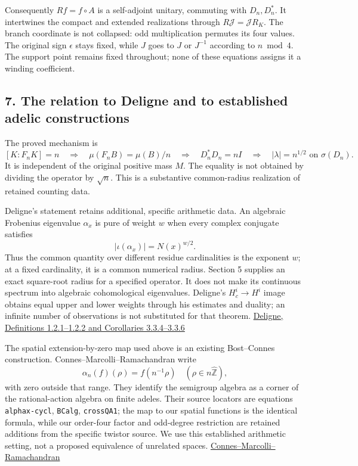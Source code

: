 \documentclass[
]{article}
\begin{document}
Consequently \(Rf=f\circ A\) is a self-adjoint unitary, commuting with
\(D_n,D_n^*\). It intertwines the compact and extended realizations
through \(R\mathcal J=\mathcal J R_K\). The branch coordinate is not
collapsed: odd multiplication permutes its four values. The original
sign \(\epsilon\) stays fixed, while \(J\) goes to \(J\) or \(J^{-1}\)
according to \(n\bmod4\). The support point remains fixed throughout;
none of these equations assigns it a winding coefficient.

\subsection{7. The relation to Deligne and to established adelic
constructions}\label{the-relation-to-deligne-and-to-established-adelic-constructions}

The proved mechanism is \[
[K:F_nK]=n
\quad\Longrightarrow\quad \mu(F_nB)=\mu(B)/n
\quad\Longrightarrow\quad D_n^*D_n=nI
\quad\Longrightarrow\quad |\lambda|=n^{1/2}\text{ on }\sigma(D_n).
\] It is independent of the original positive mass \(M\). The equality
is not obtained by dividing the operator by \(\sqrt n\). This is a
substantive common-radius realization of retained counting data.

Deligne's statement retains additional, specific arithmetic data. An
algebraic Frobenius eigenvalue \(\alpha_x\) is pure of weight \(w\) when
every complex conjugate satisfies \[
|\iota(\alpha_x)|=N(x)^{w/2}.
\] Thus the common quantity over different residue cardinalities is the
exponent \(w\); at a fixed cardinality, it is a common numerical radius.
Section 5 supplies an exact square-root radius for a specified operator.
It does not make its continuous spectrum into algebraic cohomological
eigenvalues. Deligne's \(H_c^i\to H^i\) image obtains equal upper and
lower weights through his estimates and duality; an infinite number of
observations is not substituted for that theorem.
\href{https://www.numdam.org/item/PMIHES_1980__52__137_0/}{Deligne,
Definitions 1.2.1--1.2.2 and Corollaries 3.3.4--3.3.6}

The spatial extension-by-zero map used above is an existing Bost--Connes
construction. Connes--Marcolli--Ramachandran write \[
\alpha_n(f)(\rho)=f(n^{-1}\rho)\quad(\rho\in n\widehat{\mathbb Z}),
\] with zero outside that range. They identify the semigroup algebra as
a corner of the rational-action algebra on finite adeles. Their source
locators are equations \texttt{alphax-cycl}, \texttt{BCalg},
\texttt{crossQA1}; the map to our spatial functions is the identical
formula, while our order-four factor and odd-degree restriction are
retained additions from the specific twistor source. We use this
established arithmetic setting, not a proposed equivalence of unrelated
spaces.
\href{https://arxiv.org/abs/math/0501424}{Connes--Marcolli--Ramachandran}
\end{document}
